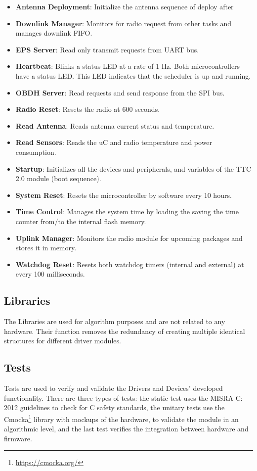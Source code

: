 \begin{itemize}
    \item \textbf{Antenna Deployment}: Initialize the antenna sequence of deploy after 
    \item \textbf{Downlink Manager}: Monitors for radio request from other tasks and manages downlink FIFO.
    \item \textbf{EPS Server}: Read only transmit requests from UART bus.
    \item \textbf{Heartbeat}: Blinks a status LED at a rate of 1 Hz. Both microcontrollers have a status LED. This LED indicates that the scheduler is up and running.
    \item \textbf{OBDH Server}: Read requests and send response from the SPI bus.
    \item \textbf{Radio Reset}: Resets the radio at 600 seconds.
    \item \textbf{Read Antenna}: Reads antenna current status and temperature.
    \item \textbf{Read Sensors}: Reads the uC and radio temperature and power consumption. 
    \item \textbf{Startup}: Initializes all the devices and peripherals, and variables of the TTC 2.0 module (boot sequence).
    \item \textbf{System Reset}: Resets the microcontroller by software every 10 hours.
    \item \textbf{Time Control}: Manages the system time by loading the saving the time counter from/to the internal flash memory.
    \item \textbf{Uplink Manager}: Monitors the radio module for upcoming packages and stores it in memory.
    \item \textbf{Watchdog Reset}: Resets both watchdog timers (internal and external) at every 100 milliseconds.
\end{itemize}

\subsection{Libraries}

The Libraries are used for algorithm purposes and are not related to any hardware. Their function removes the redundancy of creating multiple identical structures for different driver modules.

\subsection{Tests}

Tests are used to verify and validate the Drivers and Devices' developed functionality. There are three types of tests: the static test uses the MISRA-C: 2012 \cite{misrac2012} guidelines to check for C safety standards, the unitary tests use the Cmocka\footnote{\href{https://cmocka.org/}{https://cmocka.org/}} library with mockups of the hardware, to validate the module in an algorithmic level, and the last test verifies the integration between hardware and firmware.
